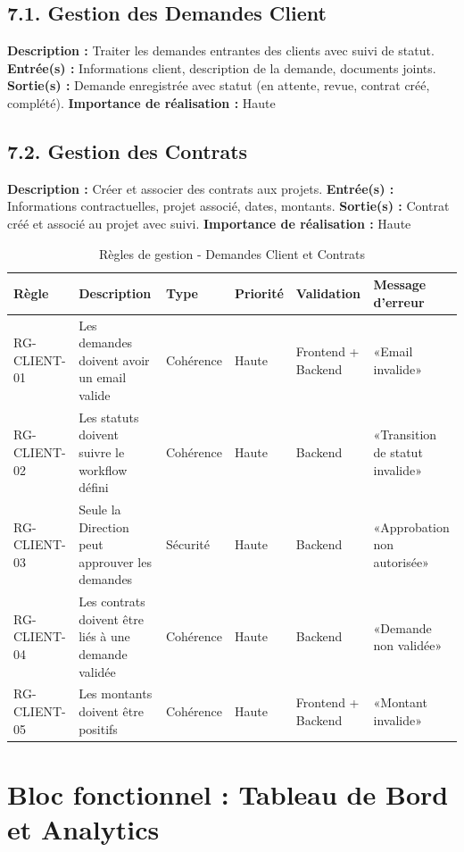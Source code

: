 \subsection{7.1. Gestion des Demandes Client}
\textbf{Description :} Traiter les demandes entrantes des clients avec suivi de statut.
\textbf{Entrée(s) :} Informations client, description de la demande, documents joints.
\textbf{Sortie(s) :} Demande enregistrée avec statut (en attente, revue, contrat créé, complété).
\textbf{Importance de réalisation :} Haute

\subsection{7.2. Gestion des Contrats}
\textbf{Description :} Créer et associer des contrats aux projets.
\textbf{Entrée(s) :} Informations contractuelles, projet associé, dates, montants.
\textbf{Sortie(s) :} Contrat créé et associé au projet avec suivi.
\textbf{Importance de réalisation :} Haute

\begin{table}[H]
\centering
\footnotesize
\begin{tabular}{|p{1.5cm}|p{3.5cm}|p{1.5cm}|p{1.5cm}|p{2cm}|p{2.5cm}|}
\hline
\textbf{Règle} & \textbf{Description} & \textbf{Type} & \textbf{Priorité} & \textbf{Validation} & \textbf{Message d'erreur} \\
\hline
RG-CLIENT-01 & Les demandes doivent avoir un email valide & Cohérence & Haute & Frontend + Backend & «Email invalide» \\
\hline
RG-CLIENT-02 & Les statuts doivent suivre le workflow défini & Cohérence & Haute & Backend & «Transition de statut invalide» \\
\hline
RG-CLIENT-03 & Seule la Direction peut approuver les demandes & Sécurité & Haute & Backend & «Approbation non autorisée» \\
\hline
RG-CLIENT-04 & Les contrats doivent être liés à une demande validée & Cohérence & Haute & Backend & «Demande non validée» \\
\hline
RG-CLIENT-05 & Les montants doivent être positifs & Cohérence & Haute & Frontend + Backend & «Montant invalide» \\
\hline
\end{tabular}
\caption{Règles de gestion - Demandes Client et Contrats}
\label{tab:rg_client}
\end{table}

\section{Bloc fonctionnel : Tableau de Bord et Analytics}


